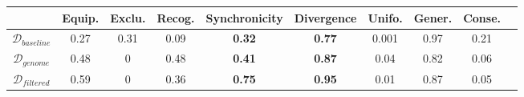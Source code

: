 \begin{tabular}{|c|c|c|c|c||c|c|c|c|c|}
    \hline
    & Equip. & Exclu. & Recog. & \textbf{Synchronicity} & \textbf{Divergence} & Unifo. & Gener.  & Conse. \\
    \hline
    $\mathcal{D}_{baseline}$ & 0.27 & 0.31 & 0.09 & \textbf{0.32} & \textbf{0.77}& 0.001 & 0.97  & 0.21 \\
    $\mathcal{D}_{genome}$ & 0.48 & 0 & 0.48 & \textbf{0.41} & \textbf{0.87} & 0.04 & 0.82  & 0.06 \\
    $\mathcal{D}_{filtered}$ & 0.59 & 0 & 0.36 & \textbf{0.75} & \textbf{0.95} & 0.01 & 0.87 & 0.05 \\
    \hline
\end{tabular}
